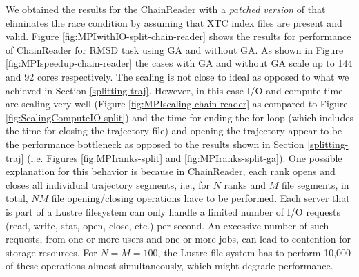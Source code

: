 We obtained the results for the ChainReader with a \emph{patched version} of  that eliminates the race condition by assuming that XTC index files are present and valid. 
Figure \ref{fig:MPIwithIO-split-chain-reader} shows the results for performance of ChainReader for RMSD task using GA and without GA. 
As shown in Figure \ref{fig:MPIspeedup-chain-reader} the cases with GA and without GA scale up to 144 and 92 cores respectively.
The scaling is not close to ideal as opposed to what we achieved in Section \ref{splitting-traj}. 
However, in this case I/O and compute time are scaling very well (Figure \ref{fig:MPIscaling-chain-reader} as compared to Figure \ref{fig:ScalingComputeIO-split}) and the time for ending the for loop  (which includes the time for closing the trajectory file) and opening the trajectory  appear to be the performance bottleneck as opposed to the results shown in Section \ref{splitting-traj} (i.e. Figures \ref{fig:MPIranks-split} and \ref{fig:MPIranks-split-ga}). 
One possible explanation for this behavior is because in ChainReader, each rank opens and closes all individual trajectory segments, i.e., for $N$ ranks and $M$ file segments, in total, $N M$ file opening/closing operations have to be performed. 
Each server that is part of a Lustre filesystem can only handle a limited number of I/O requests (read, write, stat, open, close, etc.) per second.
An excessive number of such requests, from one or more users and one or more jobs, can lead to contention for storage resources. 
For $N=M=100$, the Lustre file system has to perform 10,000 of these operations almost simultaneously, which might degrade performance. 
 
